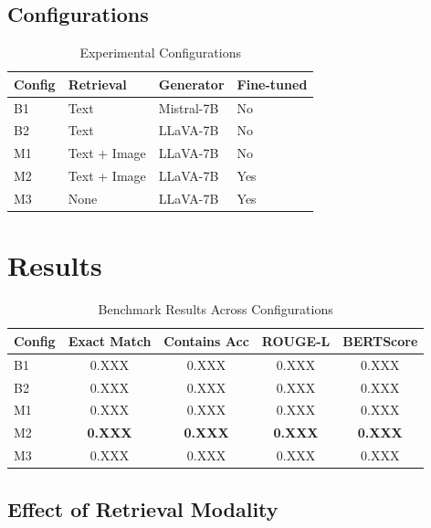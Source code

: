 \documentclass[conference]{IEEEtran}
\begin{document}
\subsection{Configurations}

\begin{table}[h]
\centering
\caption{Experimental Configurations}
\begin{tabular}{llll}
\toprule
Config & Retrieval & Generator & Fine-tuned \\
\midrule
B1 & Text & Mistral-7B & No \\
B2 & Text & LLaVA-7B & No \\
M1 & Text + Image & LLaVA-7B & No \\
M2 & Text + Image & LLaVA-7B & Yes \\
M3 & None & LLaVA-7B & Yes \\
\bottomrule
\end{tabular}
\label{tab:configs}
\end{table}

\section{Results}
\label{sec:results}


\begin{table}[h]
\centering
\caption{Benchmark Results Across Configurations}
\begin{tabular}{lcccc}
\toprule
Config & Exact Match & Contains Acc & ROUGE-L & BERTScore \\
\midrule
B1 & 0.XXX & 0.XXX & 0.XXX & 0.XXX \\
B2 & 0.XXX & 0.XXX & 0.XXX & 0.XXX \\
M1 & 0.XXX & 0.XXX & 0.XXX & 0.XXX \\
M2 & \textbf{0.XXX} & \textbf{0.XXX} & \textbf{0.XXX} & \textbf{0.XXX} \\
M3 & 0.XXX & 0.XXX & 0.XXX & 0.XXX \\
\bottomrule
\end{tabular}
\label{tab:results}
\end{table}

\subsection{Effect of Retrieval Modality}
\end{document}
